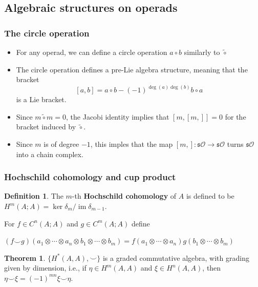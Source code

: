 \documentclass{beamer}
\theoremstyle{definition}
\newtheorem{teorema}{Theorem}
\newtheorem{defi}{Definition}
\DeclareMathOperator{\im}{im}
\begin{document}
\subsection{Algebraic structures on operads}
\begin{frame}
\frametitle{The circle operation}
\begin{itemize}
\item<1-> For any operad, we can define a circle operation $a\circ b$ similarly to $\tilde{\circ}$ %
\item The circle operation defines a pre-Lie algebra structure, meaning that the bracket
\[[a,b]=a\circ b-(-1)^{\deg(a)\deg(b)}b\circ a\]
is a Lie bracket.
\end{itemize}
\end{frame}

\begin{frame}
\begin{itemize}
\item<1-> Since $m\tilde{\circ}m=0$, the Jacobi identity implies that $[m,[m,]]=0$ for the bracket induced by $\tilde{\circ}$.
\item<2-> Since $m$ is of degree $-1$, this imples that the map $[m,]:\mathfrak{s}\mathcal{O}\to\mathfrak{s}\mathcal{O}$ turns $\mathfrak{s}\mathcal{O}$ into a chain complex.
\end{itemize}
\end{frame}


\begin{frame}
	\frametitle{Hochschild cohomology and cup product}
	\begin{defi}
		The $m$-th \textbf{Hochschild cohomology} of $A$ is defined to be $H^m(A;A)=\ker\delta_m/\im\delta_{m-1}$.
		\end{defi}\pause
		
		For $f\in C^n(A;A)$ and $g\in C^m(A;A)$ define
		
		 $(f\smile g)(a_1\otimes\cdots\otimes a_n\otimes b_1\otimes\cdots\otimes b_m)=f(a_1\otimes\cdots\otimes a_n)g(b_1\otimes\cdots\otimes b_m)$\pause
	\begin{teorema}
		$\{H^*(A,A),\smile\}$ is a graded commutative algebra, with grading given by dimension, i.e., if $\eta\in H^m(A,A)$ and $\xi\in H^n(A,A)$, then $\eta\smile \xi =(-1)^{mn}\xi\smile \eta$.
	\end{teorema} 
\end{frame}
\end{document}
